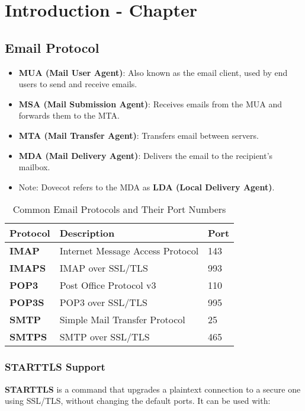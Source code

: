 \chapter{Introduction - Chapter}

\section{Email Protocol}

\begin{itemize}
    \item \textbf{MUA (Mail User Agent)}: Also known as the email client, used by end users to send and receive emails.
    \item \textbf{MSA (Mail Submission Agent)}: Receives emails from the MUA and forwards them to the MTA.
    \item \textbf{MTA (Mail Transfer Agent)}: Transfers email between servers.
    \item \textbf{MDA (Mail Delivery Agent)}: Delivers the email to the recipient’s mailbox.
    \item Note: Dovecot refers to the MDA as \textbf{LDA (Local Delivery Agent)}.
\end{itemize}
  
\begin{table}[h!]
    \centering
    \caption{Common Email Protocols and Their Port Numbers}
    \begin{tabular}{>{\bfseries}l l l}
    \toprule
    Protocol & Description & Port \\
    \midrule
    IMAP     & Internet Message Access Protocol & 143 \\
    IMAPS    & IMAP over SSL/TLS               & 993 \\
    POP3     & Post Office Protocol v3         & 110 \\
    POP3S    & POP3 over SSL/TLS               & 995 \\
    SMTP     & Simple Mail Transfer Protocol   & 25 \\
    SMTPS    & SMTP over SSL/TLS               & 465 \\
    \bottomrule
    \end{tabular}
\end{table}

\subsection{STARTTLS Support}

\noindent \textbf{STARTTLS} is a command that upgrades a plaintext connection to a secure one using SSL/TLS, without changing the default ports. It can be used with:

